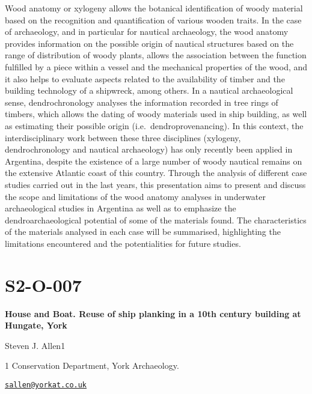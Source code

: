 \documentclass[
]{book}
\begin{document}
Wood anatomy or xylogeny allows the botanical identification of woody material based on the recognition and quantification of various wooden traits. In the case of archaeology, and in particular for nautical archaeology, the wood anatomy provides information on the possible origin of nautical structures based on the range of distribution of woody plants, allows the association between the function fulfilled by a piece within a vessel and the mechanical properties of the wood, and it also helps to evaluate aspects related to the availability of timber and the building technology of a shipwreck, among others. In a nautical archaeological sense, dendrochronology analyses the information recorded in tree rings of timbers, which allows the dating of woody materials used in ship building, as well as estimating their possible origin (i.e.~dendroprovenancing). In this context, the interdisciplinary work between these three disciplines (xylogeny, dendrochronology and nautical archaeology) has only recently been applied in Argentina, despite the existence of a large number of woody nautical remains on the extensive Atlantic coast of this country. Through the analysis of different case studies carried out in the last years, this presentation aims to present and discuss the scope and limitations of the wood anatomy analyses in underwater archaeological studies in Argentina as well as to emphasize the dendroarchaeological potential of some of the materials found. The characteristics of the materials analysed in each case will be summarised, highlighting the limitations encountered and the potentialities for future studies.

\hypertarget{s2-o-007}{%
\section*{S2-O-007}\label{s2-o-007}}

\textbf{House and Boat. Reuse of ship planking in a 10th century building at Hungate, York}

Steven J. Allen1

1 Conservation Department, York Archaeology.

\href{mailto:sallen@yorkat.co.uk}{\nolinkurl{sallen@yorkat.co.uk}}
\end{document}

